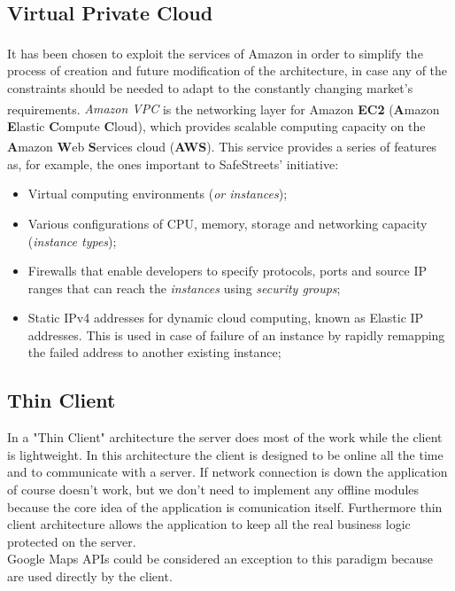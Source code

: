     \subsection{Virtual Private Cloud}
    It has been chosen to exploit the services of
    Amazon\textsuperscript{\textcopyright} in order to simplify the process of
    creation and future modification of the architecture, in case any of the
    constraints should be needed to adapt to the constantly changing market's
    requirements. \emph{Amazon\textsuperscript{\textcopyright} VPC} is the
    networking layer for Amazon\textsuperscript{\textcopyright} \textbf{EC2}
    (\textbf{A}mazon\textsuperscript{\textcopyright} \textbf{E}lastic
    \textbf{C}ompute \textbf{C}loud), which provides scalable computing capacity
    on the \textbf{A}mazon\textsuperscript{\textcopyright} \textbf{W}eb
    \textbf{S}ervices cloud (\textbf{AWS}). This service provides a series of
    features as, for example, the ones important to SafeStreets' initiative:
    \begin{itemize}
        \item Virtual computing environments (\emph{or instances});
        \item Various configurations of CPU, memory, storage and networking
        capacity (\emph{instance types});
        \item Firewalls that enable developers to specify protocols, ports and
        source IP ranges that can reach the \emph{instances} using
        \emph{security groups};
        \item Static IPv4 addresses for dynamic cloud computing, known as
        Elastic IP addresses. This is used in case of failure of an instance by
        rapidly remapping the failed address to another existing instance;
    \end{itemize}

    \subsection{Thin Client}
    In a "Thin Client" architecture the server does most of the work while the
    client is lightweight. In this architecture the client is designed to be
    online all the time and to communicate with a server. If network connection
    is down the application of course doesn't work, but we don't need to
    implement any offline modules because the core idea of the application is
    comunication itself. Furthermore thin client architecture allows the
    application to keep all the real business logic protected on the server.
    \\Google Maps APIs could be considered an exception to this paradigm because
    are used directly by the client.

